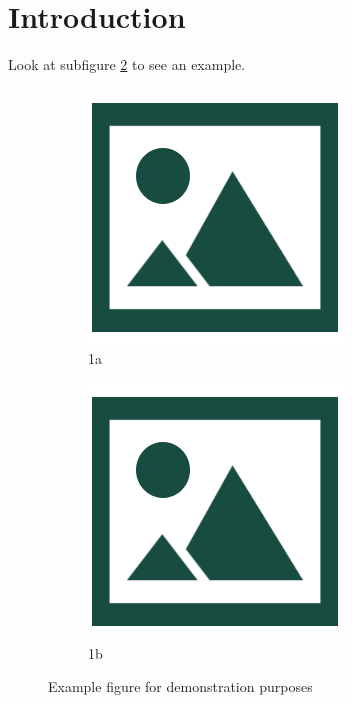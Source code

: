 \documentclass[12pt]{article}
\begin{document}
\maketitle

\section{Introduction}

Look at subfigure \ref{fig:sfig2} to see an example.

\begin{figure}[htb]
\begin{subfigure}{.5\textwidth}
  \centering
  \includegraphics[width=.8\linewidth]{img/dummy}
  \caption{1a}
  \label{fig:sfig1}
\end{subfigure}%
\begin{subfigure}{.5\textwidth}
  \centering
  \includegraphics[width=.8\linewidth]{img/dummy}
  \caption{1b}
  \label{fig:sfig2}
\end{subfigure}
\caption{Example figure for demonstration purposes}
\label{fig:fig}
\end{figure}
\end{document}

